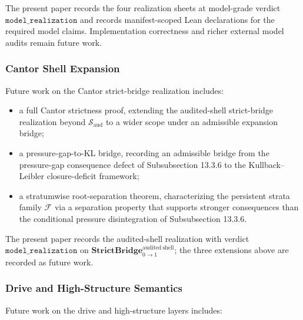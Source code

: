 \documentclass[11pt]{article}
\providecommand{\tightlist}{}
\theoremstyle{definition}
\begin{document}
The present paper records the four realization sheets at model-grade verdict \(\texttt{model\_realization}\) and records manifest-scoped Lean declarations for the required model claims. Implementation correctness and richer external model audits remain future work.

\subsubsection{Cantor Shell Expansion}

Future work on the Cantor strict-bridge realization includes:

\begin{itemize}
\tightlist
\item
  a full Cantor strictness proof, extending the audited-shell strict-bridge realization beyond \(\mathcal S_{\mathrm{aud}}\) to a wider scope under an admissible expansion bridge;
\item
  a pressure-gap-to-KL bridge, recording an admissible bridge from the pressure-gap consequence defect of Subsubsection 13.3.6 to the Kullback--Leibler closure-deficit framework;
\item
  a stratumwise root-separation theorem, characterizing the persistent strata family \(\mathcal F\) via a separation property that supports stronger consequences than the conditional pressure disintegration of Subsubsection 13.3.6.
\end{itemize}

The present paper records the audited-shell realization with verdict \(\texttt{model\_realization}\) on \(\mathbf{StrictBridge}_{0\to 1}^{\mathrm{audited\ shell}}\); the three extensions above are recorded as future work.

\subsubsection{Drive and High-Structure Semantics}

Future work on the drive and high-structure layers includes:
\end{document}
